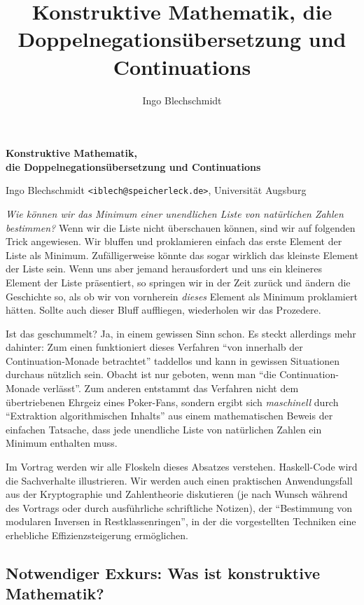 \documentclass[a4paper,ngerman,10pt]{scrartcl}
\title{Konstruktive Mathematik, die Doppelnegationsübersetzung und Continuations}
\author{Ingo Blechschmidt}
\theoremstyle{plain}
\begin{document}
\begin{center}\large\textsf{\textbf{Konstruktive Mathematik, \\ die
Doppelnegationsübersetzung und Continuations}}

\normalsize Ingo Blechschmidt \texttt{<iblech@speicherleck.de>}, Universität
Augsburg\end{center}

\emph{Wie können wir das Minimum einer unendlichen Liste von natürlichen
Zahlen bestimmen?} Wenn wir die Liste nicht überschauen können, sind wir auf folgenden Trick
angewiesen. Wir bluffen und proklamieren einfach das erste Element der Liste als
Minimum. Zufälligerweise könnte das sogar wirklich das kleinste Element der Liste
sein. Wenn uns aber jemand herausfordert und uns ein kleineres Element der
Liste präsentiert, so springen wir in der Zeit zurück und ändern die Geschichte
so, als ob wir von vornherein \emph{dieses} Element als Minimum proklamiert
hätten. Sollte auch dieser Bluff auffliegen, wiederholen wir das Prozedere.

Ist das geschummelt? Ja, in einem gewissen Sinn schon. Es steckt allerdings
mehr dahinter: Zum einen funktioniert dieses Verfahren "`von innerhalb der
Continuation-Monade betrachtet"' taddellos und kann in gewissen Situationen
durchaus nützlich sein. Obacht ist nur geboten, wenn man "`die
Continuation-Monade verlässt"'. Zum anderen entstammt das Verfahren nicht dem
übertriebenen Ehrgeiz eines Poker-Fans, sondern ergibt sich \emph{maschinell}
durch "`Extraktion algorithmischen Inhalts"' aus einem mathematischen Beweis
der einfachen Tatsache, dass jede unendliche Liste von natürlichen Zahlen ein
Minimum enthalten muss.

Im Vortrag werden wir alle Floskeln dieses Absatzes verstehen. Haskell-Code
wird die Sachverhalte illustrieren. Wir werden auch einen praktischen
Anwendungsfall aus der Kryptographie und Zahlentheorie diskutieren (je nach
Wunsch während des Vortrags oder durch ausführliche schriftliche Notizen), der
"`Bestimmung von modularen Inversen in Restklassenringen"', in der die
vorgestellten Techniken eine erhebliche Effizienzsteigerung ermöglichen.


\subsection*{Notwendiger Exkurs: Was ist konstruktive Mathematik?}
\end{document}
